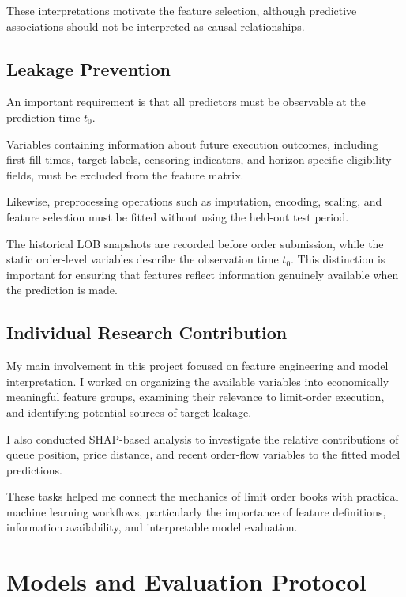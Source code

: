 \documentclass[11pt,a4paper]{article}
\begin{document}
These interpretations motivate the feature selection,
although predictive associations should not be
interpreted as causal relationships.

\subsection{Leakage Prevention}

An important requirement is that all predictors
must be observable at the prediction time $t_0$.

Variables containing information about future
execution outcomes, including first-fill times,
target labels, censoring indicators, and
horizon-specific eligibility fields, must be
excluded from the feature matrix.

Likewise, preprocessing operations such as
imputation, encoding, scaling, and feature
selection must be fitted without using the
held-out test period.

The historical LOB snapshots are recorded before
order submission, while the static order-level
variables describe the observation time $t_0$.
This distinction is important for ensuring
that features reflect information genuinely
available when the prediction is made.

\subsection{Individual Research Contribution}

My main involvement in this project focused on
feature engineering and model interpretation.
I worked on organizing the available variables
into economically meaningful feature groups,
examining their relevance to limit-order execution,
and identifying potential sources of target leakage.

I also conducted SHAP-based analysis to investigate
the relative contributions of queue position,
price distance, and recent order-flow variables
to the fitted model predictions.

These tasks helped me connect the mechanics of
limit order books with practical machine learning
workflows, particularly the importance of
feature definitions, information availability,
and interpretable model evaluation.

\section{Models and Evaluation Protocol}
\end{document}

